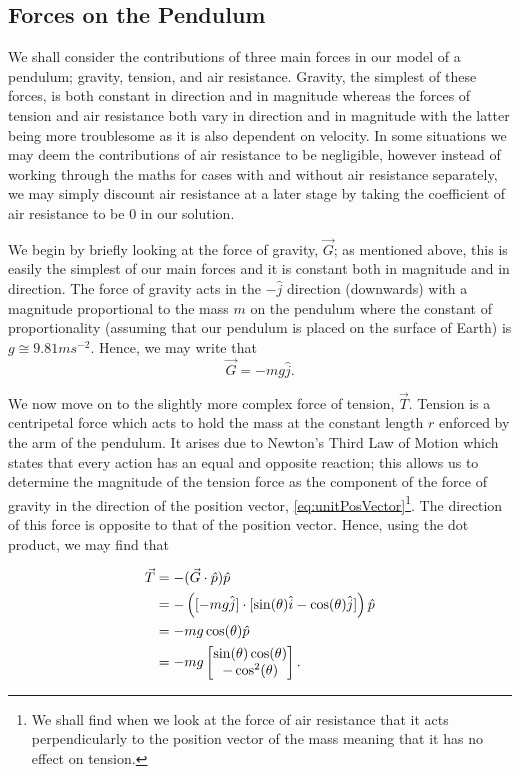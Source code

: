 \documentclass{article}
\begin{document}
\subsection{Forces on the Pendulum}

We shall consider the contributions of three main forces in our model of a pendulum; gravity, tension, and air resistance. Gravity, the simplest of these forces, is both constant in direction and in magnitude whereas the forces of tension and air resistance both vary in direction and in magnitude with the latter being more troublesome as it is also dependent on velocity. In some situations we may deem the contributions of air resistance to be negligible, however instead of working through the maths for cases with and without air resistance separately, we may simply discount air resistance at a later stage by taking the coefficient of air resistance to be $0$ in our solution.

We begin by briefly looking at the force of gravity, $\vec{G}$; as mentioned above, this is easily the simplest of our main forces and it is constant both in magnitude and in direction. The force of gravity acts in the $-\hat{j}$ direction (downwards) with a magnitude proportional to the mass $m$ on the pendulum where the constant of proportionality (assuming that our pendulum is placed on the surface of Earth) is $g \cong 9.81ms^{-2}$. Hence, we may write that
\begin{equation} \label{eq:gravity}
	\vec{G} = -mg\hat{j}.
\end{equation}

We now move on to the slightly more complex force of tension, $\vec{T}$. Tension is a centripetal force which acts to hold the mass at the constant length $r$ enforced by the arm of the pendulum. It arises due to Newton's Third Law of Motion which states that every action has an equal and opposite reaction; this allows us to determine the magnitude of the tension force as the component of the force of gravity in the direction of the position vector, \eqref{eq:unitPosVector}\footnote{We shall find when we look at the force of air resistance that it acts perpendicularly to the position vector of the mass meaning that it has no effect on tension.}. The direction of this force is opposite to that of the position vector. Hence, using the dot product, we may find that

\begin{align} 
	\vec{T} &= -(\vec{G} \cdot \hat{p})\hat{p} \notag \\
	&= -\left([-mg\hat{j}] \cdot [\sin(\theta)\hat{i} - \cos(\theta)\hat{j}]\right)\hat{p} \notag \\
	&= -mg\cos(\theta)\hat{p} \notag \\
	&= -mg
	\begin{bmatrix}
		\sin(\theta)\cos(\theta) \\
		-\cos^2(\theta)
	\end{bmatrix}
	. \label{eq:tension}
\end{align}
\end{document}
